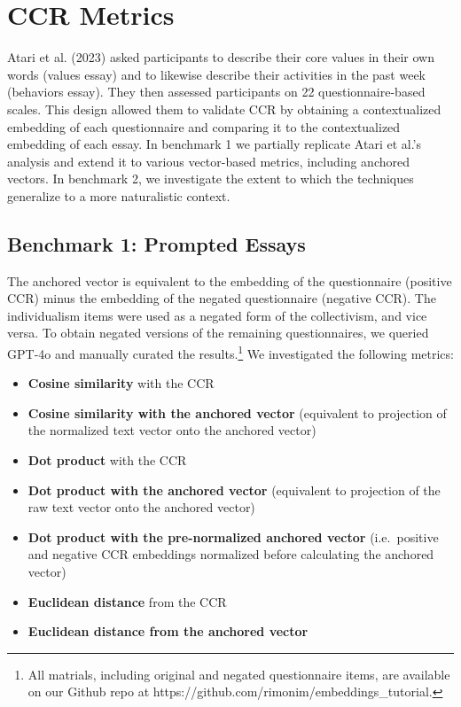 \documentclass[
  man,
  floatsintext,
  longtable,
  nolmodern,
  notxfonts,
  notimes,
  colorlinks=true,linkcolor=blue,citecolor=blue,urlcolor=blue]{apa7}
\providecommand{\tightlist}{%
  \setlength{\itemsep}{0pt}\setlength{\parskip}{0pt}}
\begin{document}
\section{CCR Metrics}\label{ccr-metrics}

Atari et al. (2023) asked participants to describe their core values in
their own words (values essay) and to likewise describe their activities
in the past week (behaviors essay). They then assessed participants on
22 questionnaire-based scales. This design allowed them to validate CCR
by obtaining a contextualized embedding of each questionnaire and
comparing it to the contextualized embedding of each essay. In benchmark
1 we partially replicate Atari et al.'s analysis and extend it to
various vector-based metrics, including anchored vectors. In benchmark
2, we investigate the extent to which the techniques generalize to a
more naturalistic context.

\subsection{Benchmark 1: Prompted
Essays}\label{benchmark-1-prompted-essays}

The anchored vector is equivalent to the embedding of the questionnaire
(positive CCR) minus the embedding of the negated questionnaire
(negative CCR). The individualism items were used as a negated form of
the collectivism, and vice versa. To obtain negated versions of the
remaining questionnaires, we queried GPT-4o and manually curated the
results.\footnote{All matrials, including original and negated
  questionnaire items, are available on our Github repo at
  https://github.com/rimonim/embeddings\_tutorial.} We investigated the
following metrics:

\begin{itemize}
\tightlist
\item
  \textbf{Cosine similarity} with the CCR
\item
  \textbf{Cosine similarity with the anchored vector} (equivalent to
  projection of the normalized text vector onto the anchored vector)
\item
  \textbf{Dot product} with the CCR
\item
  \textbf{Dot product with the anchored vector} (equivalent to
  projection of the raw text vector onto the anchored vector)
\item
  \textbf{Dot product with the pre-normalized anchored vector}
  (i.e.~positive and negative CCR embeddings normalized before
  calculating the anchored vector)
\item
  \textbf{Euclidean distance} from the CCR
\item
  \textbf{Euclidean distance from the anchored vector}
\end{itemize}
\end{document}

